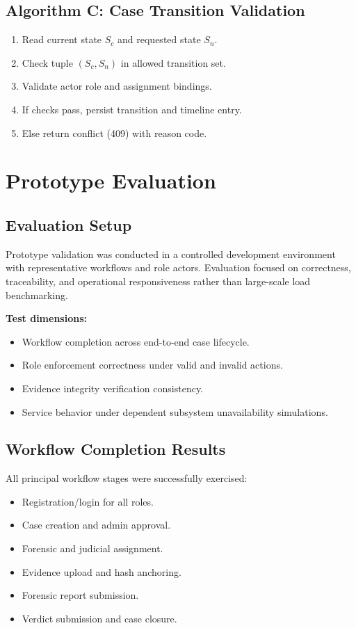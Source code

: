 \documentclass[conference]{IEEEtran}
\begin{document}
\subsection{Algorithm C: Case Transition Validation}
\begin{enumerate}
    \item Read current state $S_c$ and requested state $S_n$.
    \item Check tuple $(S_c, S_n)$ in allowed transition set.
    \item Validate actor role and assignment bindings.
    \item If checks pass, persist transition and timeline entry.
    \item Else return conflict (409) with reason code.
\end{enumerate}

\section{Prototype Evaluation}
\subsection{Evaluation Setup}
Prototype validation was conducted in a controlled development environment with representative workflows and role actors. Evaluation focused on correctness, traceability, and operational responsiveness rather than large-scale load benchmarking.

\textbf{Test dimensions:}
\begin{itemize}
    \item Workflow completion across end-to-end case lifecycle.
    \item Role enforcement correctness under valid and invalid actions.
    \item Evidence integrity verification consistency.
    \item Service behavior under dependent subsystem unavailability simulations.
\end{itemize}

\subsection{Workflow Completion Results}
All principal workflow stages were successfully exercised:
\begin{itemize}
    \item Registration/login for all roles.
    \item Case creation and admin approval.
    \item Forensic and judicial assignment.
    \item Evidence upload and hash anchoring.
    \item Forensic report submission.
    \item Verdict submission and case closure.
\end{itemize}
\end{document}
